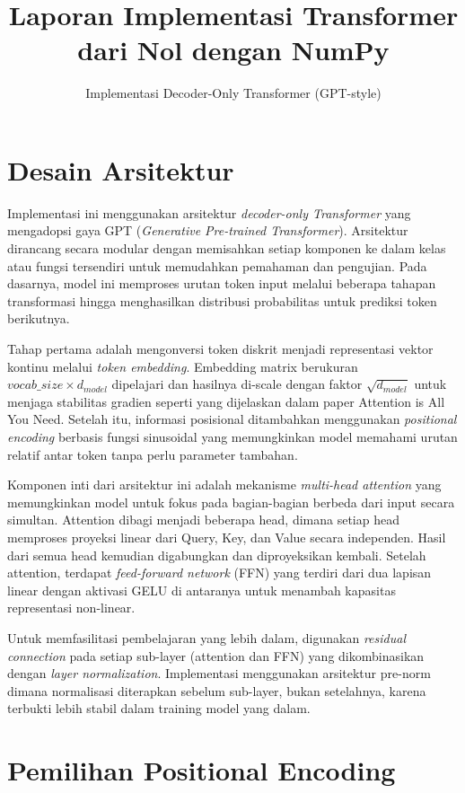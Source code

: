 \documentclass[11pt,a4paper]{article}
\title{\textbf{Laporan Implementasi Transformer dari Nol dengan NumPy}}
\author{Implementasi Decoder-Only Transformer (GPT-style)}
\date{}
\begin{document}
\maketitle

\section{Desain Arsitektur}

Implementasi ini menggunakan arsitektur \textit{decoder-only Transformer} yang mengadopsi gaya GPT (\textit{Generative Pre-trained Transformer}). Arsitektur dirancang secara modular dengan memisahkan setiap komponen ke dalam kelas atau fungsi tersendiri untuk memudahkan pemahaman dan pengujian. Pada dasarnya, model ini memproses urutan token input melalui beberapa tahapan transformasi hingga menghasilkan distribusi probabilitas untuk prediksi token berikutnya.

Tahap pertama adalah mengonversi token diskrit menjadi representasi vektor kontinu melalui \textit{token embedding}. Embedding matrix berukuran $vocab\_size \times d_{model}$ dipelajari dan hasilnya di-scale dengan faktor $\sqrt{d_{model}}$ untuk menjaga stabilitas gradien seperti yang dijelaskan dalam paper Attention is All You Need. Setelah itu, informasi posisional ditambahkan menggunakan \textit{positional encoding} berbasis fungsi sinusoidal yang memungkinkan model memahami urutan relatif antar token tanpa perlu parameter tambahan.

Komponen inti dari arsitektur ini adalah mekanisme \textit{multi-head attention} yang memungkinkan model untuk fokus pada bagian-bagian berbeda dari input secara simultan. Attention dibagi menjadi beberapa head, dimana setiap head memproses proyeksi linear dari Query, Key, dan Value secara independen. Hasil dari semua head kemudian digabungkan dan diproyeksikan kembali. Setelah attention, terdapat \textit{feed-forward network} (FFN) yang terdiri dari dua lapisan linear dengan aktivasi GELU di antaranya untuk menambah kapasitas representasi non-linear.

Untuk memfasilitasi pembelajaran yang lebih dalam, digunakan \textit{residual connection} pada setiap sub-layer (attention dan FFN) yang dikombinasikan dengan \textit{layer normalization}. Implementasi menggunakan arsitektur pre-norm dimana normalisasi diterapkan sebelum sub-layer, bukan setelahnya, karena terbukti lebih stabil dalam training model yang dalam.

\section{Pemilihan Positional Encoding}
\end{document}
